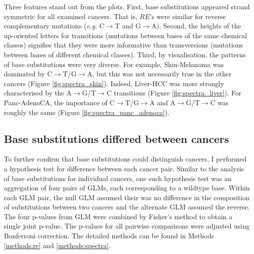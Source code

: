Three features stand out from the plots. First, base substitutions appeared strand symmetric for all examined cancers. That is, $RE$'s were similar for reverse complementary mutations (\textit{e.g.} C$\rightarrow$T and G$\rightarrow$A). Second, the heights of the up-oriented letters for \glspl{transition} (mutations between bases of the same chemical classes) signifies that they were more informative than \glspl{transversion} (mutations between bases of different chemical classes). Third, by visualisation, the patterns of base substitutions were very diverse. For example, Skin-Melanoma was dominated by C$\rightarrow$T/G$\rightarrow$A, but this was not necessarily true in the other cancers (Figure \ref{fig:spectra_skin}). Indeed, Liver-HCC was more strongly characterised by the A$\rightarrow$G/T$\rightarrow$C transitions (Figure \ref{fig:spectra_liver}). For Panc-AdenoCA, the importance of C$\rightarrow$T/G$\rightarrow$A and A$\rightarrow$G/T$\rightarrow$C was roughly the same (Figure \ref{fig:spectra_panc_adenoca}).



\subsection{Base substitutions differed between cancers}\label{sce:paired_spectra}
To further confirm that base substitutions could distinguish cancers, I performed a hypothesis test for difference between each cancer pair. Similar to the analysis of base substitutions for individual cancers, one such hypothesis test was an aggregation of four pairs of GLMs, each corresponding to a wildtype base. Within each GLM pair, the null GLM assumed their was no difference in the composition of substitutions between two cancers and the alternate GLM assumed the reverse. The four p-values from GLM were combined by Fisher's method to obtain a single joint p-value. The p-values for all pairwise comparisons were adjusted using Bonferroni correction. The detailed methods can be found in Methods \ref{methods:re} and \ref{methods:spectra}.

